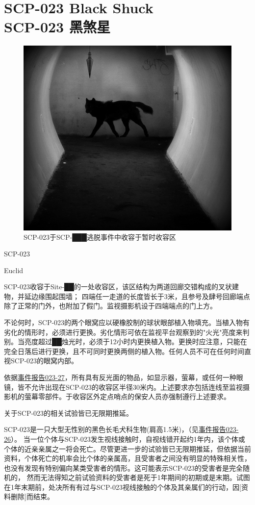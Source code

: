 \chapter[SCP-023 黑煞星]{
    SCP-023 Black Shuck\\
    SCP-023 黑煞星
}

\label{chap:SCP-023}

\begin{figure}[H]
    \centering
    \includegraphics[width=0.5\linewidth]{images/SCP-023.jpg}
    \caption*{SCP-023于SCP-███逃脱事件中收容于暂时收容区}
\end{figure}

SCP-023

Euclid

 SCP-023收容于Site-██的一处收容区，该区结构为两道回廊交错构成的叉状建物，并延边缘围起围墙； 四端任一走道的长度皆长于3米，且参号及肆号回廊端点除了正常的门外，也附加了假门。监视摄影机设于四端端点的门上方。

不论何时，SCP-023的两个眼窝应以硬橡胶制的球状眼部植入物填充。当植入物有劣化的情形时，必须进行更换。劣化情形可依在监视平台观察到的"火光"亮度来判别。当亮度超过██烛光时，必须于12小时内更换植入物。更换时应注意，只能在完全日落后进行更换，且不可同时更换两侧的植入物。任何人员不可在任何时间直视SCP-023的眼窝内部。

依据\hyperref[sec:DOC-incident-023-27]{事件报告023-27}，所有具有反光面的物品，如显示器，萤幕，或任何一种眼镜，皆不允许出现在SCP-023的收容区半径30米内。上述要求亦包括连线至监视摄影机的萤幕零部件。于收容区外定点哨点的保安人员亦强制遵行上述要求。

关于SCP-023的相关试验皆已无限期推延。

SCP-023是一只大型无性别的黑色长毛犬科生物(肩高1.5米)，（见\hyperref[sec:DOC-incident-report-023-26]{事件报告023-26}）。 当一位个体与SCP-023发生视线接触时，自视线错开起约1年内，该个体或个体的近亲亲属之一将会死亡。尽管更进一步的试验皆已无限期推延，但依据当前资料，个体死亡的机率会比个体的亲属高，且受害者之间没有明显的特殊相关性，也没有发现有特别偏向某类受害者的情形。这可能表示SCP-023的受害者是完全随机的， 然而无法得知之前试验资料的受害者是死于1年期间的初期或是末期。试图在1年末期前，处决所有有过与SCP-023视线接触的个体及其亲属们的行动，因[资料删除]而结束。

